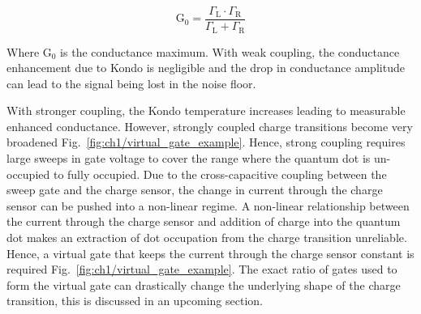 \begin{equation}\label{eq:cond_amp}
  \mathrm{G_0} = 
  \frac
  {\Gamma_\mathrm{L}\cdot\Gamma_\mathrm{R}}
  {\Gamma_\mathrm{L} + \Gamma_\mathrm{R}}
\end{equation}

Where $\mathrm{G_0}$ is the conductance maximum. With weak coupling, the conductance enhancement due to Kondo is negligible and the drop in conductance amplitude can  lead to the signal being lost in the noise floor. 

With stronger coupling, the Kondo temperature increases leading to measurable enhanced conductance. However, strongly coupled charge transitions become very broadened Fig.~\ref{fig:ch1/virtual_gate_example}. Hence, strong coupling requires large sweeps in gate voltage to cover the range where the quantum dot is un-occupied to fully occupied. Due to the cross-capacitive coupling between the sweep gate and the charge sensor, the change in current through the charge sensor can be pushed into a non-linear regime. A non-linear relationship between the current through the charge sensor and addition of charge into the quantum dot makes an extraction of dot occupation from the charge transition unreliable. Hence, a virtual gate that keeps the current through the charge sensor constant is required Fig.~\ref{fig:ch1/virtual_gate_example}. The exact ratio of gates used to form the virtual gate can drastically change the underlying shape of the charge transition, this is discussed in an upcoming section.   



